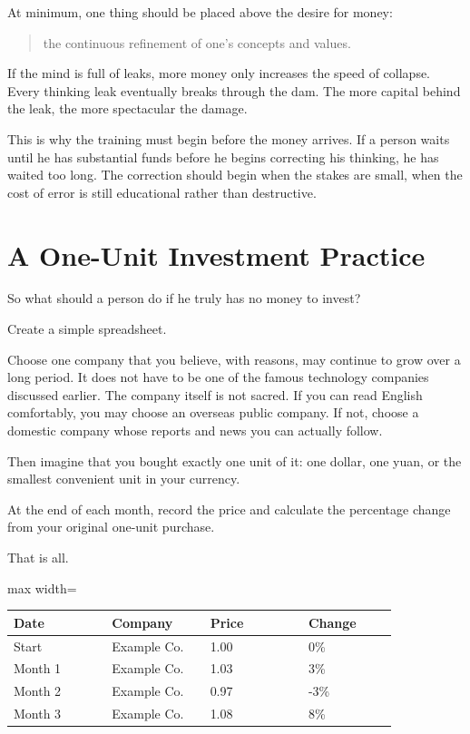 At minimum, one thing should be placed above the desire for money:

\begin{quote}
the continuous refinement of one's concepts and values.
\end{quote}

If the mind is full of leaks, more money only increases the speed of collapse. Every thinking leak eventually breaks through the dam. The more capital behind the leak, the more spectacular the damage.

This is why the training must begin before the money arrives. If a person waits until he has substantial funds before he begins correcting his thinking, he has waited too long. The correction should begin when the stakes are small, when the cost of error is still educational rather than destructive.

\section*{A One-Unit Investment Practice}

So what should a person do if he truly has no money to invest?

Create a simple spreadsheet.

Choose one company that you believe, with reasons, may continue to grow over a long period. It does not have to be one of the famous technology companies discussed earlier. The company itself is not sacred. If you can read English comfortably, you may choose an overseas public company. If not, choose a domestic company whose reports and news you can actually follow.

Then imagine that you bought exactly one unit of it: one dollar, one yuan, or the smallest convenient unit in your currency.

At the end of each month, record the price and calculate the percentage change from your original one-unit purchase.

That is all.

\begin{center}
\begin{adjustbox}{max width=\linewidth}
\begin{tabular}{p{0.22\linewidth}p{0.22\linewidth}p{0.22\linewidth}p{0.20\linewidth}}
\hline
Date & Company & Price & Change \\
\hline
Start & Example Co. & 1.00 & 0\% \\
Month 1 & Example Co. & 1.03 & 3\% \\
Month 2 & Example Co. & 0.97 & -3\% \\
Month 3 & Example Co. & 1.08 & 8\% \\
\hline
\end{tabular}
\end{adjustbox}
\end{center}

